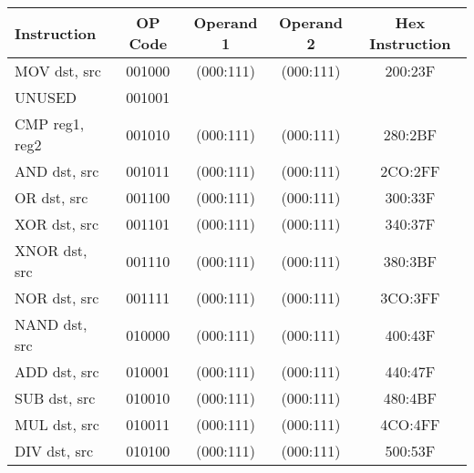 \documentclass[a4paper, 11pt]{report}
\begin{document}
\begin{center}
    \begin{tabular}{|l|c|c|c|c|}
        \hline
        \textbf{Instruction} & \textbf{OP Code} & \textbf{Operand 1} & \textbf{Operand 2} & \textbf{Hex Instruction} \\
        \hline
        MOV dst, src         & 001000           & (000:111)          & (000:111)          & 200:23F                  \\
        \hline
        UNUSED               & 001001           &                    &                    &                          \\
        \hline
        CMP reg1, reg2       & 001010           & (000:111)          & (000:111)          & 280:2BF                  \\
        \hline
        AND dst, src         & 001011           & (000:111)          & (000:111)          & 2CO:2FF                  \\
        \hline
        OR dst, src          & 001100           & (000:111)          & (000:111)          & 300:33F                  \\
        \hline
        XOR dst, src         & 001101           & (000:111)          & (000:111)          & 340:37F                  \\
        \hline
        XNOR dst, src        & 001110           & (000:111)          & (000:111)          & 380:3BF                  \\
        \hline
        NOR dst, src         & 001111           & (000:111)          & (000:111)          & 3CO:3FF                  \\
        \hline
        NAND dst, src        & 010000           & (000:111)          & (000:111)          & 400:43F                  \\
        \hline
        ADD dst, src         & 010001           & (000:111)          & (000:111)          & 440:47F                  \\
        \hline
        SUB dst, src         & 010010           & (000:111)          & (000:111)          & 480:4BF                  \\
        \hline
        MUL dst, src         & 010011           & (000:111)          & (000:111)          & 4CO:4FF                  \\
        \hline
        DIV dst, src         & 010100           & (000:111)          & (000:111)          & 500:53F                  \\
        \hline
    \end{tabular}
\end{center}
\end{document}
